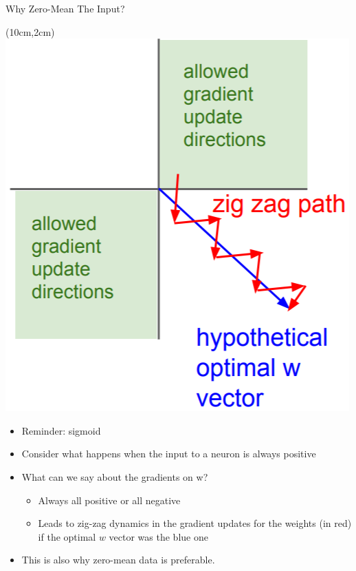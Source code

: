 \documentclass[serif, aspectratio=169]{beamer}
\begin{document}
\begin{frame}{Why Zero-Mean The Input?}

	\begin{textblock*}{5cm}(10cm,2cm) %
		\includegraphics[keepaspectratio, scale=0.3]{pic/zigzag}
	\end{textblock*}

	\begin{itemize}
		\item Reminder: sigmoid
		\item Consider what happens when the input \newline to a neuron is always positive
		\item What can we say about the gradients on w? 
		\begin{itemize}
			\item Always all positive or all negative
			\item Leads to zig-zag dynamics in the gradient updates \newline for the weights (in red) if the optimal $w$ vector was \newline the blue one
		\end{itemize}

		\item This is also why zero-mean data is preferable.
	\end{itemize}
	
\end{frame}
\end{document}
